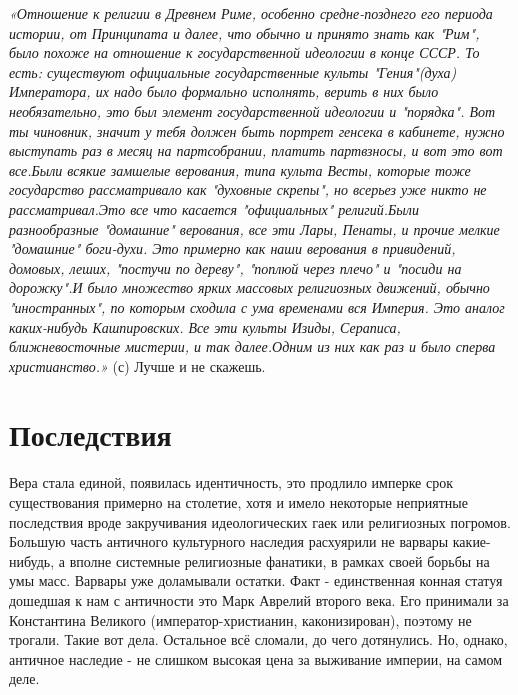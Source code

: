 \textit{«Отношение к религии в Древнем Риме, особенно средне-позднего его периода истории, от Принципата и далее, что обычно и принято знать как "Рим", было похоже на отношение к государственной идеологии в конце СССР. То есть: существуют официальные государственные культы "Гения"(духа) Императора, их надо было формально исполнять, верить в них было необязательно, это был элемент государственной идеологии и "порядка". Вот ты чиновник, значит у тебя должен быть портрет генсека в кабинете, нужно выступать раз в месяц на партсобрании, платить партвзносы, и вот это вот все.Были всякие замшелые верования, типа культа Весты, которые тоже государство рассматривало как "духовные скрепы", но всерьез уже никто не рассматривал.Это все что касается "официальных" религий.Были разнообразные "домашние" верования, все эти Лары, Пенаты, и прочие мелкие "домашние" боги-духи. Это примерно как наши верования в привидений, домовых, леших, "постучи по дереву", "поплюй через плечо" и "посиди на дорожку".И было множество ярких массовых религиозных движений, обычно "иностранных", по которым сходила с ума временами вся Империя. Это аналог каких-нибудь Кашпировских. Все эти культы Изиды, Сераписа, ближневосточные мистерии, и так далее.Одним из них как раз и было сперва христианство.»} (с) Лучше и не скажешь.
\section{Последствия}

Вера стала единой, появилась идентичность, это продлило имперке срок существования примерно на столетие, хотя и имело некоторые неприятные последствия вроде закручивания идеологических гаек или религиозных погромов. Большую часть античного культурного наследия расхуярили не варвары какие-нибудь, а вполне системные религиозные фанатики, в рамках своей борьбы на умы масс. Варвары уже доламывали остатки. Факт - единственная конная статуя дошедшая к нам с античности это Марк Аврелий второго века. Его принимали за Константина Великого (император-христианин, каконизирован), поэтому не трогали. Такие вот дела. Остальное всё сломали, до чего дотянулись. Но, однако, античное наследие - не слишком высокая цена за выживание империи, на самом деле. 

